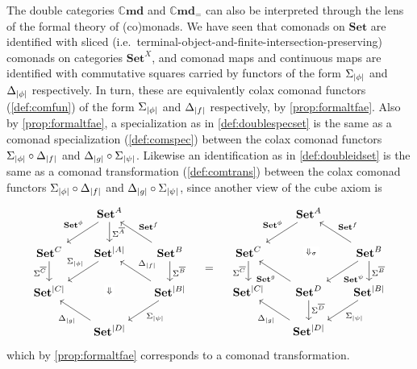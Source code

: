 \documentclass[11pt, oneside, article]{memoir}
\theoremstyle{plain}
\theoremstyle{definition}
\theoremstyle{remark}
\newenvironment{remark}
{\renewcommand\qedsymbol{$\lrcorner$}%
  \pushQED{\qed}\myremark}
{\popQED\endmyremark}
\DeclarePairedDelimiter{\abs}{\lvert}{\rvert}
\newcommand{\namedcat}[1]{\mathbf{#1}}
\newcommand{\Set}{\namedcat{Set}}
\newcommand{\Cmd}{\mathbb{C}\namedcat{md}}
\newcommand{\CmdId}{\Cmd_=}
\newcommand{\CoalgOn}[2]{{#2}^{#1}}
\newcommand{\CoalgSet}[1]{\CoalgOn{#1}{\Set}}
\newcommand{\clift}[1]{\overline{#1}}
\newcommand{\pts}[1]{{\abs{#1}}}
\newcommand{\one}[1]{\pts{#1}}
\newcommand{\carr}{\Sigma}
\newcommand{\leindex}[1]{\Sigma_{#1}}
\newcommand{\reindex}[1]{\Delta_{#1}}
\newcommand{\car}[1]{\carr^{#1}}
\newcommand{\com}[2]{{#1}^{#2}}
\newcommand{\con}[2]{{#1}^{#2}}
\newcommand{\cmnd}[1]{{#1}}
\newcommand{\cA}{\cmnd{A}}
\newcommand{\cB}{\cmnd{B}}
\newcommand{\cC}{\cmnd{C}}
\newcommand{\cD}{\cmnd{D}}
\newcommand{\ASet}{\CoalgSet{\cA}}
\newcommand{\BSet}{\CoalgSet{\cB}}
\newcommand{\CSet}{\CoalgSet{\cC}}
\newcommand{\DSet}{\CoalgSet{\cD}}
\newcommand{\SetpA}{\Set^\pts{\cA}}
\newcommand{\SetpB}{\Set^\pts{\cB}}
\newcommand{\SetpC}{\Set^\pts{\cC}}
\newcommand{\SetpD}{\Set^\pts{\cD}}
\begin{document}
\begin{remark}\label{rem:doubleformal}
  The double categories $\Cmd$ and $\CmdId$ can also be interpreted
  through the lens of the formal theory of (co)monads. We have seen
  that comonads on $\Set$ are identified with sliced (i.e.\
  terminal-object-and-finite-intersection-preserving) comonads on
  categories $\Set^X$, and comonad maps and continuous maps are
  identified with commutative squares carried by functors of the form
  $\leindex{\one{\phi}}$ and $\reindex{\one{\phi}}$ respectively. In
  turn, these are equivalently colax comonad functors
  (\cref{def:comfun}) of the form $\leindex{\one{\phi}}$ and
  $\reindex{\one{f}}$ respectively, by \cref{prop:formaltfae}. Also by
  \cref{prop:formaltfae}, a specialization as in
  \cref{def:doublespecset} is the same as a comonad specialization
  (\cref{def:comspec}) between the colax comonad functors
  $\leindex{\one{\phi}} \circ \reindex{\one{f}}$ and
  $\reindex{\one{g}} \circ \leindex{\one{\psi}}$. Likewise an
  identification as in \cref{def:doubleidset} is the same as a comonad
  transformation (\cref{def:comtrans}) between the colax comonad
  functors $\leindex{\one{\phi}} \circ \reindex{\one{f}}$ and
  $\reindex{\one{g}} \circ \leindex{\one{\psi}}$, since another view
  of the cube axiom is
  \[
    \begin{tikzcd}[column sep=17]
      & \ASet & \\
      \CSet & \SetpA & \BSet \\
      \SetpC && \SetpB \\
      & \SetpD
      \arrow["{\com{\Set}{\phi}}"', pos=.4, from=1-2, to=2-1]
      \arrow["{\car{\clift{\cA}}}", from=1-2, to=2-2]
      \arrow["{\car{\clift{\cC}}}"', from=2-1, to=3-1]
      \arrow["{\leindex{\one{\phi}}}"', pos=.4, from=2-2, to=3-1]
      \arrow["\Downarrow"{description}, draw=none, from=2-2, to=4-2]
      \arrow["{\con{\Set}{f}}"', from=2-3, to=1-2]
      \arrow["{\car{\clift{\cB}}}", from=2-3, to=3-3]
      \arrow["{\reindex{\one{f}}}"', from=3-3, to=2-2]
      \arrow["{\leindex{\one{\psi}}}", from=3-3, to=4-2]
      \arrow["{\reindex{\one{g}}}", pos=.4, from=4-2, to=3-1]
    \end{tikzcd}
    \quad=\quad
    \begin{tikzcd}[column sep=17]
      & \ASet & \\
      \CSet && \BSet \\
      \SetpC & \DSet & \SetpB \\
      & \SetpD
      \arrow["{\com{\Set}{\phi}}"', pos=.4, from=1-2, to=2-1]
      \arrow["{\Downarrow_\sigma}"{description}, shift left, draw=none, from=1-2, to=3-2]
      \arrow["{\car{\clift{\cC}}}"', from=2-1, to=3-1]
      \arrow["{\con{\Set}{f}}"', from=2-3, to=1-2]
      \arrow["{\com{\Set}{\psi}}", pos=.55, from=2-3, to=3-2]
      \arrow["{\car{\clift{\cB}}}", from=2-3, to=3-3]
      \arrow["{\con{\Set}{g}}", pos=.4, from=3-2, to=2-1]
      \arrow["{\car{\clift{\cD}}}", pos=.4, from=3-2, to=4-2]
      \arrow["{\leindex{\one{\psi}}}", from=3-3, to=4-2]
      \arrow["{\reindex{\one{g}}}", pos=.4, from=4-2, to=3-1]
    \end{tikzcd}
  \]
  which by \cref{prop:formaltfae} corresponds to a comonad
  transformation.


\end{remark}
\end{document}
